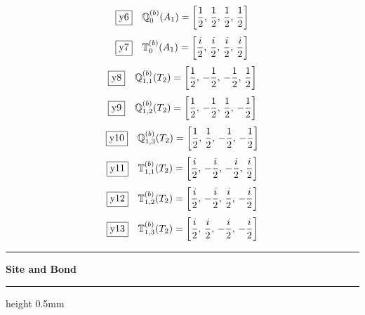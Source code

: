 \documentclass[fleqn,10pt,landscape]{jsarticle}
\begin{document}
\begin{dmath*}
\fbox{y6}\quad \mathbb{Q}_{0}^{(b)}(A_{1})=\left[ \frac{1}{2},\, \frac{1}{2},\, \frac{1}{2},\, \frac{1}{2} \right]
\end{dmath*}
\begin{dmath*}
\fbox{y7}\quad \mathbb{T}_{0}^{(b)}(A_{1})=\left[ \frac{i}{2},\, \frac{i}{2},\, \frac{i}{2},\, \frac{i}{2} \right]
\end{dmath*}
\begin{dmath*}
\fbox{y8}\quad \mathbb{Q}_{1,1}^{(b)}(T_{2})=\left[ \frac{1}{2},\, - \frac{1}{2},\, - \frac{1}{2},\, \frac{1}{2} \right]
\end{dmath*}
\begin{dmath*}
\fbox{y9}\quad \mathbb{Q}_{1,2}^{(b)}(T_{2})=\left[ \frac{1}{2},\, - \frac{1}{2},\, \frac{1}{2},\, - \frac{1}{2} \right]
\end{dmath*}
\begin{dmath*}
\fbox{y10}\quad \mathbb{Q}_{1,3}^{(b)}(T_{2})=\left[ \frac{1}{2},\, \frac{1}{2},\, - \frac{1}{2},\, - \frac{1}{2} \right]
\end{dmath*}
\begin{dmath*}
\fbox{y11}\quad \mathbb{T}_{1,1}^{(b)}(T_{2})=\left[ \frac{i}{2},\, - \frac{i}{2},\, - \frac{i}{2},\, \frac{i}{2} \right]
\end{dmath*}
\begin{dmath*}
\fbox{y12}\quad \mathbb{T}_{1,2}^{(b)}(T_{2})=\left[ \frac{i}{2},\, - \frac{i}{2},\, \frac{i}{2},\, - \frac{i}{2} \right]
\end{dmath*}
\begin{dmath*}
\fbox{y13}\quad \mathbb{T}_{1,3}^{(b)}(T_{2})=\left[ \frac{i}{2},\, \frac{i}{2},\, - \frac{i}{2},\, - \frac{i}{2} \right]
\end{dmath*}
\vspace{5mm}
\noindent \rule[0.5mm]{5mm}{0.5mm}\hspace{3mm}\textbf{Site and Bond}\hspace{3mm}\leaders\hrule height 0.5mm\hfill\kern0pt
\vspace{3mm}
\end{document}
